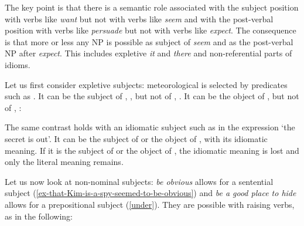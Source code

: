 The key point is that there is a semantic role associated with the subject position with verbs like
\emph{want} but not with verbs like \emph{seem} and with the post-verbal position with verbs like
\emph{persuade} but not with verbs like \emph{expect}.  The consequence is that more or less any NP
is possible as subject of \emph{seem} and as the post-verbal NP after \emph{expect}. This includes
expletive \emph{it} and \emph{there} and non-referential parts of idioms.

Let us first consider expletive subjects: meteorological  is selected by predicates
such as . It can be the subject of , , but not of ,
. It can be the object of ,  but not of ,
:
	
\eal
{}
 \label{rain1}
 \label{rain2}
\zl
\eal
{} \label{rain3}
 \label{rain4}
\zl
 	
The same contrast holds with an idiomatic subject such as  in the expression  `the secret is out'. It can be the subject of  or the object of
, with its idiomatic meaning. If it is the subject of  or the object of
, the idiomatic meaning is lost and only the literal meaning remains. 
 
\eal
\judgewidth{\#}
 \label{cat1}
 \label{cat2}
 \label{cat3}
 \label{cat4}
\zl

Let us now look at non-nominal subjects: \emph{be obvious} allows for a sentential subject (\ref{ex-that-Kim-is-a-spy-seemed-to-be-obvious}) and
\emph{be a good place to hide} allows for a prepositional subject (\ref{under}). They are possible with raising
verbs, as in the following: 
 
\eal
{} 
 \label{ex-that-Kim-is-a-spy-seemed-to-be-obvious}
\zl
\eal
{}
 \label{under}
\zl


